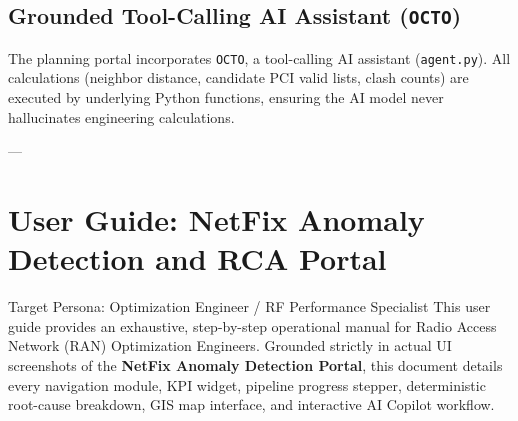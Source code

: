 \documentclass[12pt,a4paper]{report}
\begin{document}
\subsection{Grounded Tool-Calling AI Assistant (\texttt{OCTO})}
The planning portal incorporates \texttt{OCTO}, a tool-calling AI assistant (\texttt{agent.py}). All calculations (neighbor distance, candidate PCI valid lists, clash counts) are executed by underlying Python functions, ensuring the AI model never hallucinates engineering calculations.

---

\section{User Guide: NetFix Anomaly Detection and RCA Portal}

\begin{guidebox}{Target Persona: Optimization Engineer / RF Performance Specialist}
This user guide provides an exhaustive, step-by-step operational manual for Radio Access Network (RAN) Optimization Engineers. Grounded strictly in actual UI screenshots of the \textbf{NetFix Anomaly Detection Portal}, this document details every navigation module, KPI widget, pipeline progress stepper, deterministic root-cause breakdown, GIS map interface, and interactive AI Copilot workflow.
\end{guidebox}
\end{document}
